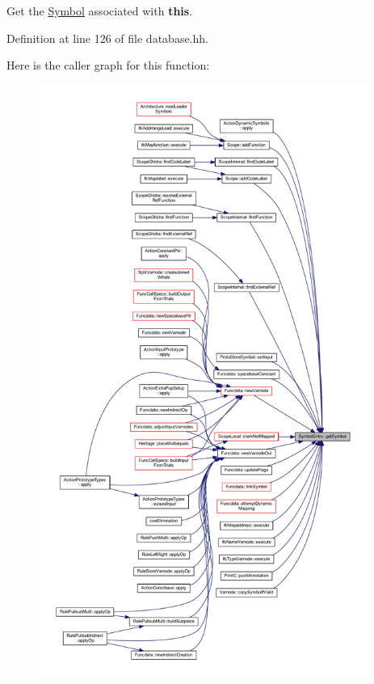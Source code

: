 Get the \mbox{\hyperlink{class_symbol}{Symbol}} associated with {\bfseries{this}}. 



Definition at line 126 of file database.\+hh.

Here is the caller graph for this function\+:
\nopagebreak
\begin{figure}[H]
\begin{center}
\leavevmode
\includegraphics[height=550pt]{class_symbol_entry_a4279c38e7f124423d5f6cbb353a33f49_icgraph}
\end{center}
\end{figure}
\mbox{\label{class_symbol_entry_acb15ad9276468db4b74b86556dfb1028}} 
